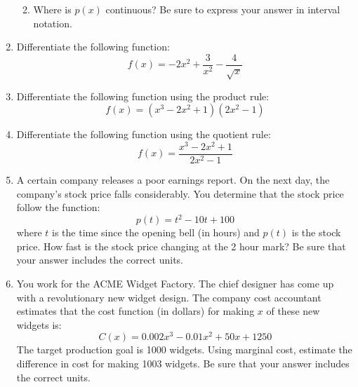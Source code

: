 \documentclass[letterpaper,12pt,fleqn]{article}
\begin{document}
\begin{enumerate}[left=0pt]
\begin{enumerate}
    \vspace{5in}
    
  \item Where is \(p(x)\) continuous?  Be sure to express your answer in interval notation.
  \end{enumerate}

  \newpage

\item Differentiate the following function:
  \[f(x)=-2x^2+\frac{3}{x^2}-\frac{4}{\sqrt{x}}\]

  \vspace{4in}

\item Differentiate the following function using the product rule:
  \[f(x)=(x^3-2x^2+1)(2x^2-1)\]

  \newpage

\item Differentiate the following function using the quotient rule:
  \[f(x)=\frac{x^3-2x^2+1}{2x^2-1}\]

  \vspace{4in}

\item A certain company releases a poor earnings report.  On the next day, the company's stock price falls considerably.
  You determine that the stock price follow the function:
  \[p(t)=t^2-10t+100\]
  where \(t\) is the time since the opening bell (in hours) and \(p(t)\) is the stock price.  How fast is the stock price
  changing at the 2 hour mark?  Be sure that your answer includes the correct units.

  \newpage

\item You work for the ACME Widget Factory.  The chief designer has come up with a revolutionary new widget design.  The
  company cost accountant estimates that the cost function (in dollars) for making \(x\) of these new widgets is:
  \[C(x)=0.002x^3-0.01x^2+50x+1250\]
  The target production goal is 1000 widgets.  Using marginal cost, estimate the difference in cost for making 1003 widgets.
  Be sure that your answer includes the correct units.  
\end{enumerate}
\end{document}
